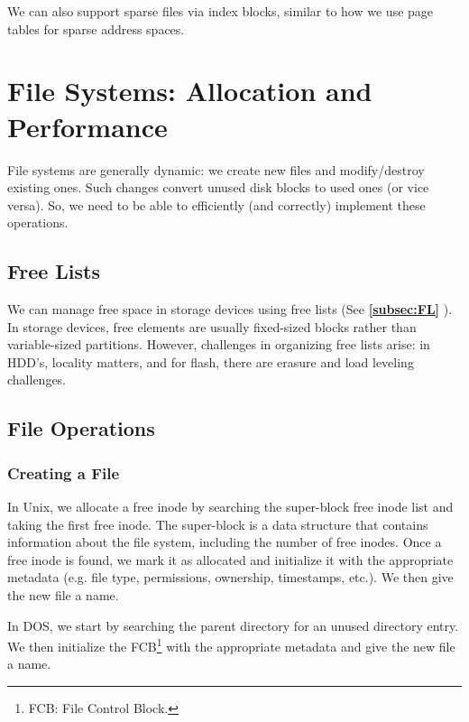 \documentclass{report}
\newcommand{\refto}[2]{\textbf{\ref{#1:#2} \nameref{#1:#2}}}
\begin{document}
We can also support sparse files via index blocks, similar to how we use page tables for sparse
address spaces.










\chapter{File Systems: Allocation and Performance}
File systems are generally dynamic: we create new files and modify/destroy existing ones. Such
changes convert unused disk blocks to used ones (or vice versa). So, we need to be able to
efficiently (and correctly) implement these operations.





\section{Free Lists}
We can manage free space in storage devices using free lists (See \refto{subsec}{FL}). In storage
devices, free elements are usually fixed-sized blocks rather than variable-sized
partitions. However, challenges in organizing free lists arise: in HDD's, locality matters, and for
flash, there are erasure and load leveling challenges.





\section{File Operations}
\subsection{Creating a File}
In Unix, we allocate a free inode by searching the super-block free inode list and taking the first
free inode. The super-block is a data structure that contains information about the file system,
including the number of free inodes. Once a free inode is found, we mark it as allocated and
initialize it with the appropriate metadata (e.g. file type, permissions, ownership, timestamps,
etc.). We then give the new file a name.

In DOS, we start by searching the parent directory for an unused directory entry. We then initialize the
FCB\footnote{FCB: File Control Block.} with the appropriate metadata and give the new file a name.
\end{document}
